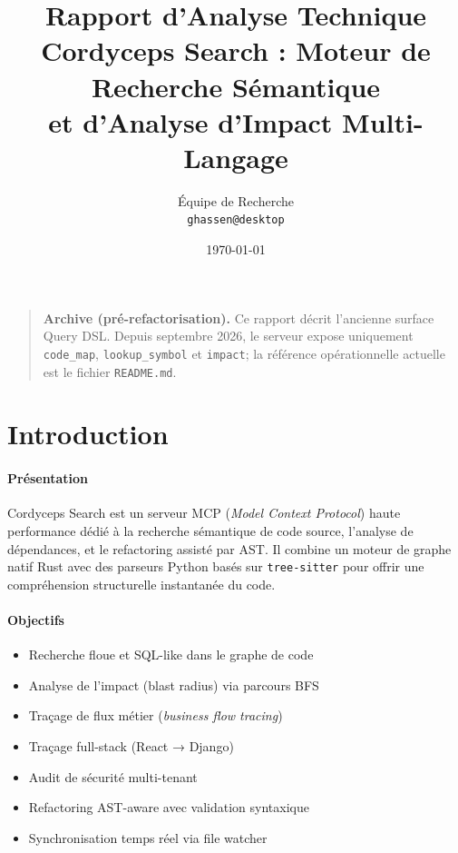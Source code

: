 \documentclass[12pt,a4paper]{article}
\title{\textbf{Rapport d'Analyse Technique} \\ \large Cordyceps Search : Moteur de Recherche Sémantique \\ et d'Analyse d'Impact Multi-Langage}
\author{Équipe de Recherche \\ \texttt{ghassen@desktop}}
\date{\today}
\newcommand{\rust}{\textcolor{rustorange}{Rust}}
\newcommand{\python}{\textcolor{pyblue}{Python}}
\begin{document}
\maketitle

\begin{quote}
\textbf{Archive (pré-refactorisation).} Ce rapport décrit l'ancienne surface
Query DSL. Depuis septembre 2026, le serveur expose uniquement
\texttt{code\_map}, \texttt{lookup\_symbol} et \texttt{impact}; la référence
opérationnelle actuelle est le fichier \texttt{README.md}.
\end{quote}
\thispagestyle{empty}
\newpage

\tableofcontents
\newpage

\section{Introduction}

\paragraph{Présentation}
Cordyceps Search est un serveur MCP (\textit{Model Context Protocol}) haute performance dédié à la recherche sémantique de code source, l'analyse de dépendances, et le refactoring assisté par AST. Il combine un moteur de graphe natif \rust{} avec des parseurs \python{} basés sur \texttt{tree-sitter} pour offrir une compréhension structurelle instantanée du code.

\paragraph{Objectifs}
\begin{itemize}
    \item Recherche floue et SQL-like dans le graphe de code
    \item Analyse de l'impact (blast radius) via parcours BFS
    \item Traçage de flux métier (\textit{business flow tracing})
    \item Traçage full-stack (React → Django)
    \item Audit de sécurité multi-tenant
    \item Refactoring AST-aware avec validation syntaxique
    \item Synchronisation temps réel via file watcher
\end{itemize}
\end{document}

